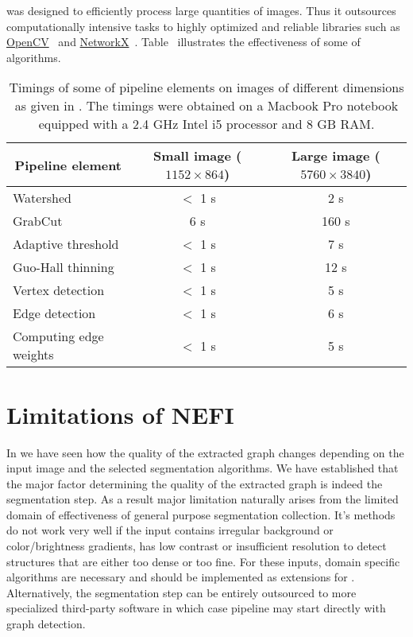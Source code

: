 		\NEFI was designed to efficiently process large quantities of images. Thus it outsources computationally intensive tasks to highly optimized and reliable libraries such as \href{http://opencv.org/}{OpenCV}~\cite{opencv} and \href{https://networkx.github.io/documentation/latest/index.html}{NetworkX}~\cite{networkx}. Table~ illustrates the effectiveness of some of \NEFIs algorithms. 


		\begin{table}
			\centering
			\begin{tabular}{@{} l *2c @{}}
			\toprule
			\multicolumn{1}{c}{Pipeline element}    & Small image ($1152 \times 864$)  & Large image ($5760 \times 3840$) \\ 
			\midrule
			Watershed & $<$ 1 \si{\second}  & 2 \si{\second}  \\
			GrabCut  & 6 \si{\second}  & 160 \si{\second}  \\
			Adaptive threshold & $<$ 1 \si{\second}  & 7 \si{\second}  \\
			Guo-Hall thinning &  $<$ 1 \si{\second}  & 12 \si{\second}  \\
			Vertex detection & $<$ 1 \si{\second}  & 5 \si{\second}  \\
			Edge detection & $<$ 1 \si{\second}   & 6 \si{\second}  \\
			Computing edge weights & $<$ 1 \si{\second}  & 5 \si{\second} \\
			\bottomrule
			\end{tabular}
			\caption[\NEFIs evaluation - Pipeline timings]{Timings of some of \NEFIs pipeline elements on images of different dimensions as given in \si{\pixel}. The timings were obtained on a Macbook Pro notebook equipped with a 2.4 GHz Intel i5 processor and 8 GB RAM.}
			\label{tab:timings}
		\end{table}

\section{Limitations of NEFI}\label{sec:limitations}

		In  we have seen how the quality of the extracted graph changes depending on the input image and the selected segmentation algorithms. We have established that the major factor determining the quality of the extracted graph is indeed the segmentation step. As a result \NEFIs major limitation naturally arises from the limited domain of effectiveness of \NEFIs general purpose segmentation collection. It's methods do not work very well if the input contains irregular background or color/brightness gradients, has low contrast or insufficient resolution to detect structures that are either too dense or too fine. For these inputs, domain specific algorithms are necessary and should be implemented as extensions for \NEFI. Alternatively, the segmentation step can be entirely outsourced to more specialized third-party software in which case \NEFIs pipeline may start directly with graph detection.

